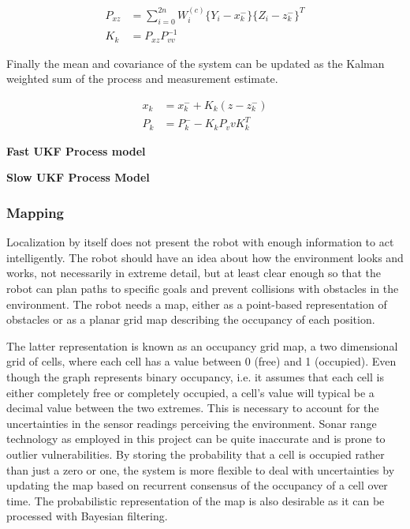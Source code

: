 \begin{align}
    P_{xz} &= \sum_{i=0}^{2n}W_i^{(c)} \{Y_i - x_k^{-}\}\{Z_i - z_k^{-}\}^T \\
    K_k &= P_{xz} P_{vv}^{-1}
\end{align}

Finally the mean and covariance of the system can be updated as the Kalman weighted sum of the process and measurement estimate.

\begin{align}
    x_k &= x_k^{-} + K_k (z - z_k^{-}) \\
    P_k &= P_k^{-} - K_k P_vv K_k^T
\end{align}

\textbf{Fast UKF Process model}

\textbf{Slow UKF Process Model}

\subsubsection{Mapping}
\label{sec:mapping}

Localization by itself does not present the robot with enough information to act intelligently. The robot should have an idea about how the environment looks and works, not necessarily in extreme detail, but at least clear enough so that the robot can plan paths to specific goals and prevent collisions with obstacles in the environment. The robot needs a map, either as a point-based representation of obstacles or as a planar grid map describing the occupancy of each position.

The latter representation is known as an occupancy grid map, a two dimensional grid of cells, where each cell has a value between 0 (free) and 1 (occupied). Even though the graph represents binary occupancy, i.e. it assumes that each cell is either completely free or completely occupied, a cell's value will typical be a decimal value between the two extremes. This is necessary to account for the uncertainties in the sensor readings perceiving the environment. Sonar range technology as employed in this project can be quite inaccurate and is prone to outlier vulnerabilities. By storing the probability that a cell is occupied rather than just a zero or one, the system is more flexible to deal with uncertainties by updating the map based on recurrent consensus of the occupancy of a cell over time. The probabilistic representation of the map is also desirable as it can be processed with Bayesian filtering. 

